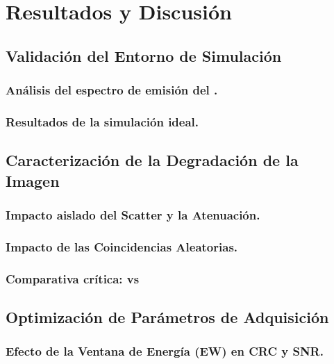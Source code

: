 \chapter{Resultados y Discusión}
\label{cap:resultados_discusion}

\section{Validación del Entorno de Simulación}
\label{sec:resultados_discusion:validacion}

\subsection{Análisis del espectro de emisión del \yochoseis.}
\subsection{Resultados de la simulación ideal.}
\section{Caracterización de la Degradación de la Imagen}
\label{sec:resultados_discusion:scater_randoms}

\subsection{Impacto aislado del Scatter y la Atenuación.}
\subsection{Impacto de las Coincidencias Aleatorias.}
\subsection{Comparativa crítica: \yochoseis vs \fdiezocho}

\section{Optimización de Parámetros de Adquisición}
\label{sec:resultados_discusion:optimizacion}

\subsection{Efecto de la Ventana de Energía (EW) en CRC y SNR.}

